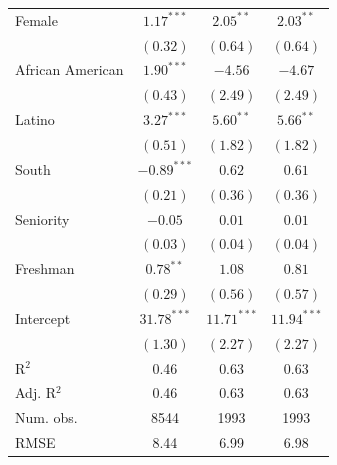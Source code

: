 \documentclass[12pt]{article}
\newcommand\fnote[1]{\captionsetup{font=normalsize}\caption*{#1}}
\begin{document}
\begin{table}[!htbp]
\begin{threeparttable}
\begin{tabular}{l c c c }
Female                            & $1.17^{***}$  & $2.05^{**}$   & $2.03^{**}$   \\
                                  & $(0.32)$      & $(0.64)$      & $(0.64)$      \\
African American                  & $1.90^{***}$  & $-4.56$       & $-4.67$       \\
                                  & $(0.43)$      & $(2.49)$      & $(2.49)$      \\
Latino                            & $3.27^{***}$  & $5.60^{**}$   & $5.66^{**}$   \\
                                  & $(0.51)$      & $(1.82)$      & $(1.82)$      \\
South                             & $-0.89^{***}$ & $0.62$        & $0.61$        \\
                                  & $(0.21)$      & $(0.36)$      & $(0.36)$      \\
Seniority                         & $-0.05$       & $0.01$        & $0.01$        \\
                                  & $(0.03)$      & $(0.04)$      & $(0.04)$      \\
Freshman                          & $0.78^{**}$   & $1.08$        & $0.81$        \\
                                  & $(0.29)$      & $(0.56)$      & $(0.57)$      \\
Intercept                         & $31.78^{***}$ & $11.71^{***}$ & $11.94^{***}$ \\
                                  & $(1.30)$      & $(2.27)$      & $(2.27)$      \\
\hline
R$^2$                             & 0.46          & 0.63          & 0.63          \\
Adj. R$^2$                        & 0.46          & 0.63          & 0.63          \\
Num. obs.                         & 8544          & 1993          & 1993          \\
RMSE                              & 8.44          & 6.99          & 6.98          \\
\hline
\end{tabular}

\end{threeparttable}
\end{table}
\end{document}
